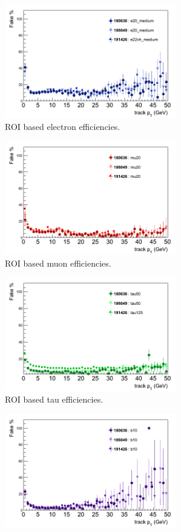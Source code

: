 \clearpage

\begin{figure}[htbp]
	\begin{subfigure}{.5\linewidth}
		\centering
		\includegraphics[width=75mm]{f/e20_medium_IDTrkNoCut_pT_IDS_fake}
		\caption{ROI based electron efficiencies.}
		\label{fig:trig_2011_L2_pt_a}
	\end{subfigure}
	\begin{subfigure}{.5\linewidth}	
		\centering
		\includegraphics[width=75mm]{f/mu20_IDTrkNoCut_pT_IDS_fake}
		\caption{ROI based muon efficiencies.}
		\label{fig:trig_2011_L2_pt_c}
	\end{subfigure}
	\begin{subfigure}{.5\linewidth}	
		\centering
		\includegraphics[width=75mm]{f/tau50_IDTrkNoCut_pT_SIT_fake}
		\caption{ROI based tau efficiencies.}
		\label{fig:trig_2011_L2_pt_e}
	\end{subfigure}
	\begin{subfigure}{.5\linewidth}	
		\centering
		\includegraphics[width=75mm]{f/b10_IDTrkNoCut_pT_SIT_fake}

\end{subfigure}
\end{figure}
